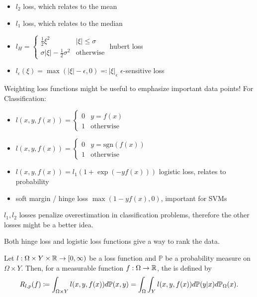 \begin{example}
    \begin{itemize}
        \item $l_2$ loss, which relates to the mean 
        \item $l_1$ loss, which relates to the median
        \item $l_H=\begin{cases}
            \frac{1}{2}\xi^2 & |\xi|\leq \sigma\\
            \sigma |\xi|-\frac{1}{2}\sigma^2 & \text{otherwise}
        \end{cases}$ hubert loss
        \item $l_\epsilon(\xi)=\max(|\xi|-\epsilon,0)\eqqcolon |\xi|_\epsilon$ $\epsilon$-sensitive loss
    \end{itemize}
    Weighting loss functions might be useful to emphasize important data points!
    For Classification:
    \begin{itemize}
        \item $l(x,y,f(x))=\begin{cases}
            0 & y=f(x)\\
            1 & \text{otherwise}
        \end{cases}$
        \item $l(x,y,f(x))=\begin{cases}
            0 & y=\text{sgn}(f(x))\\
            1 & \text{otherwise}
        \end{cases}$
        \item $l(x,y,f(x))=l_1(1+\exp(-y f(x)))$ logistic loss, relates to probability
        \item soft margin / hinge loss $\max(1-yf(x),0)$, important for SVMs 
    \end{itemize}
\end{example}

\begin{aremark}
    $l_1,l_2$ losses penalize overestimation in classification problems, therefore the other losses might be a better idea.
    
    Both hinge loss and logistic loss functions give a way to rank the data.
\end{aremark}

\begin{definition}\label{def:44}
    Let $l:\Omega\times Y\times \mathbb{R}\to[0,\infty)$ be a loss function and $\mathbb{P}$ be a probability measure 
    on $\Omega\times Y$. Then, for a measurable function $f:\Omega\to\mathbb{R}$, the  is defined by 
    \[R_{l,p}(f)\coloneqq \int_{\Omega\times Y} l(x,y,f(x))d\mathbb{P}(x,y)=\int_\Omega\int_Y l(x,y,f(x))d \mathbb{P}(y|x)d\mathbb{P}_\Omega(x).\]
\end{definition}


